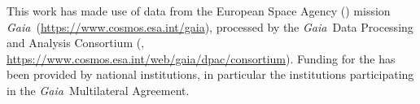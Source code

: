\documentclass[modern]{aastex63}
\newcommand{\gaia}{\textsl{Gaia}}
\newcommand{\apogee}{\acronym{APOGEE}}
\newcommand{\sdss}{\acronym{SDSS}}
\begin{document}
This work has made use of data from the European Space Agency ()
mission \gaia\ (\url{https://www.cosmos.esa.int/gaia}), processed by the \gaia\
Data Processing and Analysis Consortium (,
\url{https://www.cosmos.esa.int/web/gaia/dpac/consortium}). Funding for the
\acronym{DPAC}
has been provided by national institutions, in particular the institutions
participating in the \gaia\ Multilateral Agreement.








\end{document}
